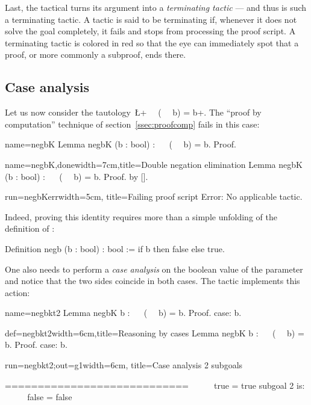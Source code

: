Last, the  tactical turns its argument into a \emph{terminating
tactic} --- and thus   is such a terminating tactic. A tactic
is said to be terminating if, whenever it does not solve the goal
completely, it
fails and stops \Coq{} from processing the proof script.
A terminating tactic is colored in red so that
the eye can immediately spot that a
proof, or more commonly a subproof, ends there.

\subsection{Case analysis}\label{ssec:case}
Let us now consider the tautology~\L+~~ (~~ b) = b+. The
``proof by computation'' technique of section~\ref{ssec:proofcomp}
fails in this case:

\begin{coqdef}{name=negbK}
Lemma negbK (b : bool) : ~~ (~~ b) = b.
Proof.
\end{coqdef}
\begin{coq}{name=negbK,done}{width=7cm,title=Double negation elimination}
Lemma negbK (b : bool) : ~~ (~~ b) = b.
Proof. by [].
\end{coq}
\begin{coqout}{run=negbKerr}{width=5cm, title=Failing proof script}
Error: No applicable
tactic.
\end{coqout}

Indeed, proving this identity requires more than a simple unfolding of
the definition of :

\begin{coq}{}{}
Definition negb (b : bool) : bool := if b then false else true.
\end{coq}
One also needs to perform a \emph{case analysis} on the boolean value
of the parameter  and notice that the two sides coincide in
both cases. The tactic  implements this action:

\begin{coqdef}{name=negbkt2}
Lemma negbK b : ~~ (~~ b) = b.
Proof.
case: b.
\end{coqdef}
\begin{coq}{def=negbkt2}{width=6cm,title=Reasoning by cases}
Lemma negbK b : ~~ (~~ b) = b.
Proof.
case: b.
$~$
$~$
$~$
\end{coq}
\begin{coqout}{run=negbkt2;out=g1}{width=6cm, title=Case analysis}
2 subgoals

  ============================
   ~~ ~~ true = true
subgoal 2 is:
 ~~ ~~ false = false
\end{coqout}

